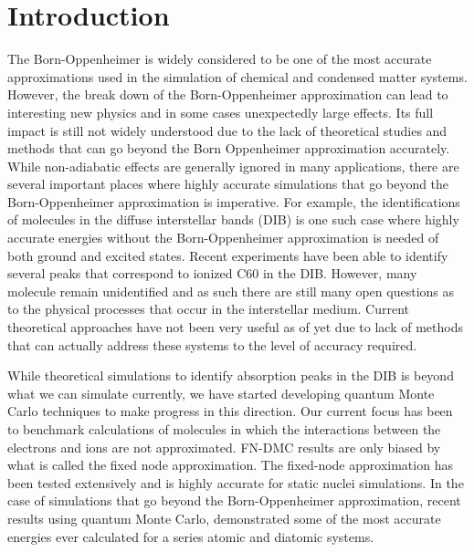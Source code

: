 \documentclass[aip,jcp,numerical,reprint]{revtex4-1}
\begin{document}
\section{Introduction}
The Born-Oppenheimer is widely considered to be one of the most accurate approximations used in the simulation of chemical and condensed matter systems.  However, the break down of the Born-Oppenheimer approximation can lead to interesting new physics and in some cases unexpectedly large effects. Its full impact is still not widely understood due to the lack of theoretical studies and methods that can go beyond the Born Oppenheimer approximation accurately.  While non-adiabatic effects are generally ignored in many applications, there are several important places where highly accurate simulations that go beyond the Born-Oppenheimer approximation is imperative.  For example, the identifications of molecules in the diffuse interstellar bands (DIB) is one such case where highly accurate energies without the Born-Oppenheimer approximation is needed of both ground and excited states.   Recent experiments have been able to identify several peaks that correspond to ionized C60 in the DIB.  However, many molecule remain unidentified and as such there are still many open questions as to the physical processes that occur in the interstellar medium.  Current theoretical approaches have not been very useful as of yet due to lack of methods that can actually address these systems to the level of accuracy required.  

While  theoretical simulations to identify absorption peaks in the DIB is beyond what we can simulate currently, we have started developing quantum Monte Carlo techniques to make progress in this direction.   Our current focus has been to benchmark calculations of molecules in which the interactions between the electrons and ions are not approximated.   FN-DMC results are only biased by what is called the fixed node approximation.  %
The fixed-node approximation has been tested extensively and is highly accurate for static nuclei simulations.  In the case of simulations that go beyond the Born-Oppenheimer approximation, recent results using quantum Monte Carlo, demonstrated some of the most accurate energies ever calculated for a series atomic and diatomic systems.
\end{document}
